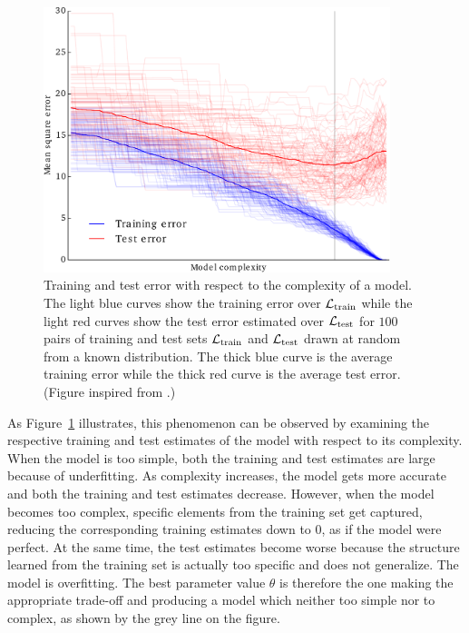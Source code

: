 \begin{figure}
    \centering
    \includegraphics[width=0.9\textwidth]{figures/ch2_train_test_error.pdf}
    \caption{Training and test error with respect to the complexity
             of a model. The light blue curves show the training error over
             ${\cal L}_\text{train}$ while the light red curves show the test
             error estimated over ${\cal L}_\text{test}$ for $100$ pairs of training
             and test sets ${\cal L}_\text{train}$ and ${\cal L}_\text{test}$
             drawn at random from a known distribution. The thick blue curve
             is the average training error while the thick red curve is the
             average test error. (Figure inspired from \citep{hastie:2005}.) }
    \label{fig:train-test-error}
\end{figure}

As Figure~\ref{fig:train-test-error}
illustrates, this phenomenon can be observed by examining the
respective training and test estimates of the model with respect to its
complexity. When the model is too simple, both the training and test estimates
are large because of underfitting. As complexity increases, the model gets more
accurate and both the training and test estimates decrease. However, when the
model becomes too complex, specific elements from the training set get captured,
reducing the corresponding training estimates down to $0$, as if the model were
perfect. At the same time, the test estimates become worse because the
structure learned from the training set is actually too specific and does not
generalize. The model is overfitting. The best parameter value $\theta$ is
therefore the one making the appropriate trade-off and producing a model which
neither too simple nor to complex, as shown by the grey line on the figure.

